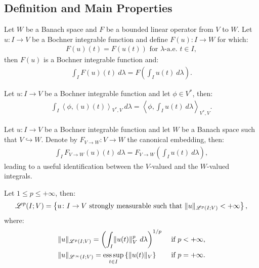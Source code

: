 \subsection{Definition and Main Properties}

\begin{corollary}
    Let $W$ be a Banach space and $F$ be a bounded linear operator from $V$ to $W$. Let $u\colon I \rightarrow V$ be a Bochner integrable function and define $F(u) \colon I \rightarrow W$ for which:
    \begin{gather}
        F(u)(t) = F(u(t)) \text{ for } \lambda \text{-a.e. } t \in I,
    \end{gather}
    then $F(u)$ is a Bochner integrable function and:
    \begin{gather}
        \int_I F(u)(t) ~ d \lambda = F\left( \int_I u(t) ~ d \lambda \right).
    \end{gather}
\end{corollary}

\begin{remark} %
    Let $u\colon I \rightarrow V$ be a Bochner integrable function and let $\phi \in V^*$, then:
    \begin{gather}
        \int_I \left\langle \phi, (u)(t) \right\rangle_{V^*, V} ~ d \lambda = \left\langle \phi, \int_I u(t) ~ d \lambda \right\rangle_{V^*, V}.
    \end{gather}
\end{remark}

\begin{remark}[Embedding]
    Let $u\colon I \rightarrow V$ be a Bochner integrable function and let $W$ be a Banach space such that $V \hookrightarrow W$. Denote by $F_{V \rightarrow W} \colon V \rightarrow W$ the canonical embedding, then:
    \begin{gather}
        \int_I F_{V \rightarrow W}(u)(t) ~ d \lambda = F_{V \rightarrow W}\left( \int_I u(t) ~ d \lambda \right),
    \end{gather}
    leading to a useful identification between the $V$-valued and the $W$-valued integrals.
\end{remark}

\begin{definition}[$\Lp{p}(I; V)$]
    Let $1 \leq p \leq +\infty$, then:
    \begin{gather}
        \mathscr{L}^{p}(I; V) = \left\{ u \colon I \rightarrow V \text{ strongly measurable such that } \lVert u \rVert_{\mathscr{L}^{p}(I; V)} < +\infty \right\},
    \end{gather}
    where:
    \begin{align}
        & \lVert u \rVert_{\mathscr{L}^{p}(I; V)} = \left( \int_I \lVert u(t) \rVert_V^p ~ d \lambda \right)^{1/p} & \text{ if } p < +\infty, \\
        & \lVert u \rVert_{\mathscr{L}^{\infty}(I; V)} = \operatorname*{ess\,sup}_{t \in I} \left\{ \lVert u(t) \rVert_V \right\} & \text{ if } p = +\infty.
    \end{align}
\end{definition}

